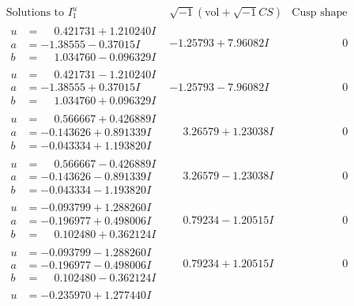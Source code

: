 \documentclass[1p]{elsarticle_modified}
\theoremstyle{definition}
\newcommand{\I}{\sqrt{-1}}
\begin{document}
$$\begin{array}{c|c|c}
\text{Solutions to }I^u_{1}& \I (\text{vol} + \sqrt{-1}CS) & \text{Cusp shape}\\
 \hline 
\begin{aligned}
u &= \phantom{-}0.421731 + 1.210240 I \\
a &= -1.38555 - 0.37015 I \\
b &= \phantom{-}1.034760 - 0.096329 I\end{aligned}
 & -1.25793 + 7.96082 I & \phantom{-0.000000 } 0 \\ \hline\begin{aligned}
u &= \phantom{-}0.421731 - 1.210240 I \\
a &= -1.38555 + 0.37015 I \\
b &= \phantom{-}1.034760 + 0.096329 I\end{aligned}
 & -1.25793 - 7.96082 I & \phantom{-0.000000 } 0 \\ \hline\begin{aligned}
u &= \phantom{-}0.566667 + 0.426889 I \\
a &= -0.143626 + 0.891339 I \\
b &= -0.043334 + 1.193820 I\end{aligned}
 & \phantom{-}3.26579 + 1.23038 I & \phantom{-0.000000 } 0 \\ \hline\begin{aligned}
u &= \phantom{-}0.566667 - 0.426889 I \\
a &= -0.143626 - 0.891339 I \\
b &= -0.043334 - 1.193820 I\end{aligned}
 & \phantom{-}3.26579 - 1.23038 I & \phantom{-0.000000 } 0 \\ \hline\begin{aligned}
u &= -0.093799 + 1.288260 I \\
a &= -0.196977 + 0.498006 I \\
b &= \phantom{-}0.102480 + 0.362124 I\end{aligned}
 & \phantom{-}0.79234 - 1.20515 I & \phantom{-0.000000 } 0 \\ \hline\begin{aligned}
u &= -0.093799 - 1.288260 I \\
a &= -0.196977 - 0.498006 I \\
b &= \phantom{-}0.102480 - 0.362124 I\end{aligned}
 & \phantom{-}0.79234 + 1.20515 I & \phantom{-0.000000 } 0 \\ \hline\begin{aligned}
u &= -0.235970 + 1.277440 I \\

\end{aligned}
\end{array}$$
\end{document}
